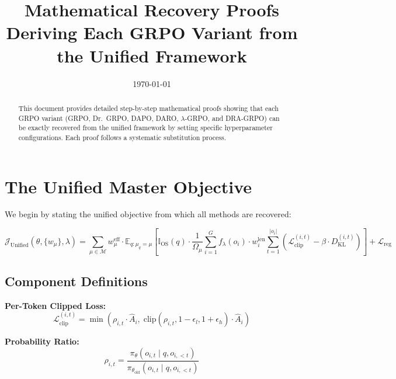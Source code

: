 \documentclass[11pt,a4paper]{article}
\title{\textbf{Mathematical Recovery Proofs}\\[0.3em]
\Large Deriving Each GRPO Variant from the Unified Framework}
\author{}
\date{\today}
\begin{document}
\maketitle

\begin{abstract}
This document provides detailed step-by-step mathematical proofs showing that each GRPO variant (GRPO, Dr.~GRPO, DAPO, DARO, $\lambda$-GRPO, and DRA-GRPO) can be exactly recovered from the unified framework by setting specific hyperparameter configurations. Each proof follows a systematic substitution process.
\end{abstract}

\tableofcontents
\newpage

\section{The Unified Master Objective}

We begin by stating the unified objective from which all methods are recovered:

\begin{equation}
\boxed{
\mathcal{J}_{\text{Unified}}(\theta, \{w_\mu\}, \lambda) = \sum_{\mu \in \mathcal{M}} w_\mu^{\text{eff}} \cdot \mathbb{E}_{q: \mu_q = \mu} \left[ \mathbb{I}_{\text{OS}}(q) \cdot \frac{1}{\Omega_\mu} \sum_{i=1}^{G} f_\lambda(o_i) \cdot w_i^{\text{len}} \sum_{t=1}^{|o_i|} \left( \mathcal{L}_{\text{clip}}^{(i,t)} - \beta \cdot D_{\text{KL}}^{(i,t)} \right) \right] + \mathcal{L}_{\text{reg}}
}
\label{eq:unified}
\end{equation}

\subsection{Component Definitions}

\textbf{Per-Token Clipped Loss:}
\begin{equation}
\mathcal{L}_{\text{clip}}^{(i,t)} = \min\left( \rho_{i,t} \cdot \hat{A}_{i}, \; \text{clip}(\rho_{i,t}, 1-\epsilon_l, 1+\epsilon_h) \cdot \hat{A}_{i} \right)
\end{equation}

\textbf{Probability Ratio:}
\begin{equation}
\rho_{i,t} = \frac{\pi_{\theta}(o_{i,t} \mid q, o_{i,<t})}{\pi_{\theta_{\text{old}}}(o_{i,t} \mid q, o_{i,<t})}
\end{equation}
\end{document}
